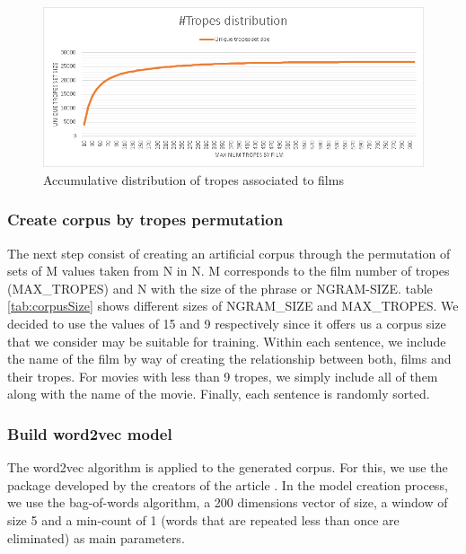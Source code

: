 \documentclass[letterpaper]{article}
\begin{document}
    \begin{figure}
\centering
\includegraphics[width=1\linewidth]{../images/tropes_distribution_chart.png}
\caption{Accumulative distribution of tropes associated to films}
\label{fig:tropesdistributionasociatedtofilms}
\end{figure}

\subsubsection{Create corpus by tropes permutation}
The next step consist of creating an artificial corpus through the permutation of sets of M values taken from N in N. M corresponds to the film number of tropes  (MAX\_TROPES) and N with the size of the phrase or NGRAM-SIZE. table \ref{tab:corpusSize} shows different sizes of NGRAM\_SIZE and MAX\_TROPES. We decided to use the values of 15 and 9 respectively since it offers us a corpus size that we consider may be suitable for training. Within each sentence, we include the name of the film by way of creating the relationship between both, films and their tropes. 
For movies with less than 9 tropes, we simply include all of them along with the name of the movie. Finally, each sentence is randomly sorted.

\subsubsection{Build word2vec model}

The word2vec algorithm is applied to the generated corpus. For this, we use the package \cite{git-hub-word2vec} developed by the creators of the article \cite{mikolov2013}. In the model creation process, we use the bag-of-words algorithm, a 200 dimensions vector of size, a window of size 5 and a min-count of 1 (words that are repeated less than once are eliminated) as main parameters.
	
	
\end{document}
